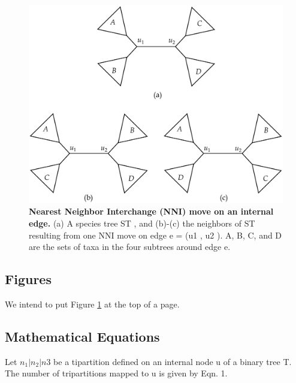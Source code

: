 \documentclass[14pt, a4paper]{article} %
\begin{document}
    \pagebreak
    \begin{figure}[t!]
        \centering
        \includegraphics[width=0.7\linewidth]{Figure3.pdf}
        \caption{\label{fig:fig1}\textbf{Nearest Neighbor Interchange (NNI) move on an internal edge.} (a)
A species tree ST , and (b)-(c) the neighbors of ST resulting from one NNI move on edge
e = (u1 , u2 ). A, B, C, and D are the sets of taxa in the four subtrees around edge e.
}   
    \end{figure}
    
    \subsection{Figures}
    We intend to put Figure \ref{fig:fig1} at the top of a page.
    
    \subsection{Mathematical Equations}
    Let $n_1|n_2|n3$ be a tipartition defined on an internal node u of a binary tree T. The number of tripartitions mapped to u is given by Eqn. 1.
    
\end{document}
